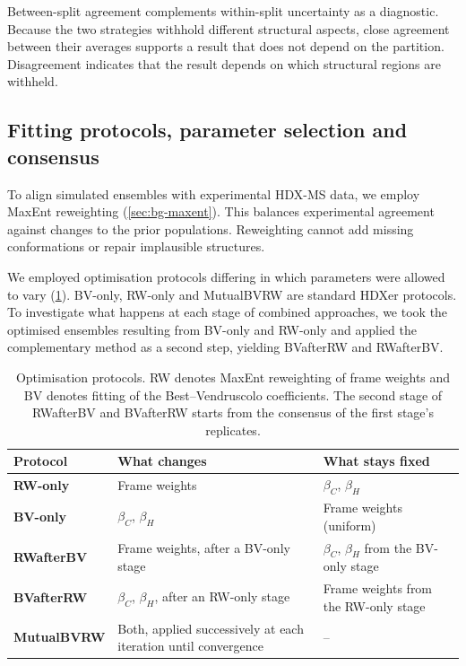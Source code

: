 Between-split agreement complements within-split uncertainty as a diagnostic. Because the two strategies withhold different structural aspects, close agreement between their averages supports a result that does not depend on the partition. Disagreement indicates that the result depends on which structural regions are withheld.

\subsection{Fitting protocols, parameter selection and consensus}
\label{sec:valdx-fitting}

To align simulated ensembles with experimental HDX-MS data, we employ MaxEnt reweighting (\cref{sec:bg-maxent}). This balances experimental agreement against changes to the prior populations. Reweighting cannot add missing conformations or repair implausible structures.

We employed optimisation protocols differing in which parameters were allowed to vary (\cref{tab:valdx-protocols}). BV-only, RW-only and MutualBVRW are standard HDXer protocols. To investigate what happens at each stage of combined approaches, we took the optimised ensembles resulting from BV-only and RW-only and applied the complementary method as a second step, yielding BVafterRW and RWafterBV.

\begin{table}[htbp]
    \centering
    \small
    \begin{tabularx}{\textwidth}{@{}l>{\raggedright\arraybackslash}X>{\raggedright\arraybackslash}X@{}}
    \toprule
        \textbf{Protocol} & \textbf{What changes} & \textbf{What stays fixed} \\
        \midrule
        \textbf{RW-only} & Frame weights & $\beta_C$, $\beta_H$ \\
        \textbf{BV-only} & $\beta_C$, $\beta_H$ & Frame weights (uniform) \\
        \textbf{RWafterBV} & Frame weights, after a BV-only stage & $\beta_C$, $\beta_H$ from the BV-only stage \\
        \textbf{BVafterRW} & $\beta_C$, $\beta_H$, after an RW-only stage & Frame weights from the RW-only stage \\
        \textbf{MutualBVRW} & Both, applied successively at each iteration until convergence & -- \\
        \bottomrule
    \end{tabularx}
    \caption{Optimisation protocols. RW denotes MaxEnt reweighting of frame weights and BV denotes fitting of the Best--Vendruscolo coefficients. The second stage of RWafterBV and BVafterRW starts from the consensus of the first stage's replicates.}
    \label{tab:valdx-protocols}
\end{table}

